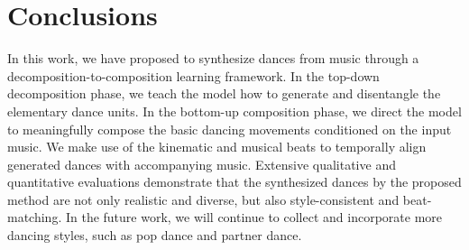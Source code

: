 \documentclass{article}
\newlength\secmargin
\begin{document}
\section{Conclusions}
\label{sec:conclusion}
\vspace{\secmargin}
In this work, we have proposed to synthesize dances from music through a decomposition-to-composition learning framework.
In the top-down decomposition phase, we teach the model how to generate and disentangle the elementary dance units.
In the bottom-up composition phase, we direct the model to meaningfully compose the basic dancing movements conditioned on the input music.
We make use of the kinematic and musical beats to temporally align generated dances with accompanying music.     
Extensive qualitative and quantitative evaluations demonstrate that the synthesized dances by the proposed method are not only realistic and diverse, but also style-consistent and beat-matching. In the future work, we will continue to collect and incorporate more dancing styles, such as pop dance and partner dance. 

\clearpage
{\small


}
\end{document}
